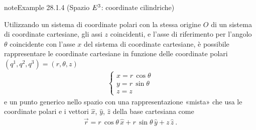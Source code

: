 \documentclass[letterpaper,10pt,italian]{jupyterBook}
\begin{document}
\label{ch/vector-calculus/geometry:example-4}
\begin{sphinxadmonition}{note}{Example 28.1.4 (Spazio \protect\(E^3\protect\): coordinate cilindriche)}



\sphinxAtStartPar
Utilizzando un sistema di coordinate polari con la stessa origine \(O\) di un sistema di coordinate cartesiane, gli assi \(z\) coincidenti, e l’asse di riferimento per l’angolo \(\theta\) coincidente con l’asse \(x\) del sistema di coordinate cartesiane, è possibile rappresentare le coordinate cartesiane in funzione delle coordinate polari \((q^1, q^2, q^3) = (r, \theta, z)\)
\begin{equation*}
\begin{split}\begin{cases}
  x = r \, \cos \theta \\
  y = r \, \sin \theta \\
  z = z 
\end{cases}\end{split}
\end{equation*}
\sphinxAtStartPar
e un punto generico nello spazio \sphinxhyphen{} con una rappresentazione «mista» che usa le coordinate polari e i vettori \(\hat{x}\), \(\hat{y}\), \(\hat{z}\) della base cartesiana\sphinxfootnotemark[1] \sphinxhyphen{} come
\begin{equation*}
\begin{split}\vec{r} = r \, \cos \theta \, \hat{x} + r \, \sin \theta \, \hat{y} + z \, \hat{z} \ .\end{split}
\end{equation*}\end{sphinxadmonition}
\label{ch/vector-calculus/geometry:example-5}
\end{document}
